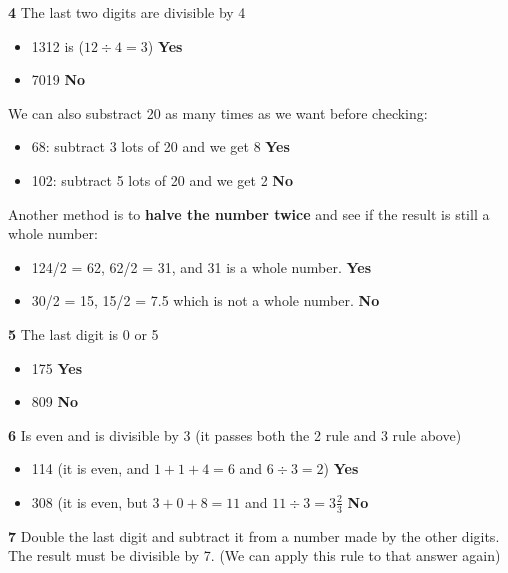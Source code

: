\vspace{10 mm}

\textbf{4} The last two digits are divisible by 4

\begin{itemize}
  \item 1312 is ($12 \div 4 = 3$) \textbf{Yes}
  \item 7019 \textbf{No}
\end{itemize}

We can also substract 20 as many times as we want before checking:

\begin{itemize}
  \item 68: subtract 3 lots of 20 and we get 8 \textbf{Yes}
  \item 102: subtract 5 lots of 20 and we get 2 \textbf{No}
\end{itemize}

Another method is to \textbf{halve the number twice} and see if the result is still a whole number:

\begin{itemize}
  \item 124/2 = 62, 62/2 = 31, and 31 is a whole number. \textbf{Yes}
  \item 30/2 = 15, 15/2 = 7.5 which is not a whole number. \textbf{No}
\end{itemize}

\vspace{10 mm}

\textbf{5} The last digit is 0 or 5

\begin{itemize}
  \item 175 \textbf{Yes}
  \item 809 \textbf{No}
\end{itemize}

\textbf{6} Is even and is divisible by 3 (it passes both the 2 rule and 3 rule above)

\begin{itemize}
  \item 114 (it is even, and $1+1+4=6$ and $6 \div 3 =2$) \textbf{Yes}
  \item 308 (it is even, but $3+0+8=11$ and $11 \div 3 = 3\frac{2}{3}$ \textbf{No}
\end{itemize}

\textbf{7} Double the last digit and subtract it from a number made by the other digits. The result must be divisible by 7. (We can apply this rule to that answer again)

